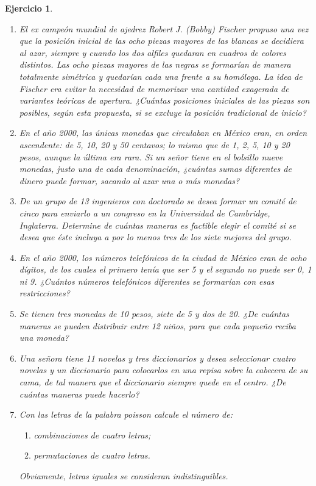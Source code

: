 \documentclass[12pt,twoside]{article}
\newtheorem{Ejer}{Ejercicio}
\begin{document}
\begin{Ejer}
\begin{enumerate}
\item El ex campeón mundial de ajedrez Robert J. (Bobby) Fischer propuso una vez que la posición inicial de las ocho piezas mayores de las blancas se decidiera al azar, siempre y cuando los dos alfiles quedaran en cuadros de colores distintos. Las ocho piezas mayores de las negras se formarían de manera totalmente simétrica y quedarían cada una frente a su homóloga. La idea de Fischer era evitar la necesidad de memorizar una cantidad exagerada de variantes teóricas de apertura. ¿Cuántas posiciones iniciales de las piezas son posibles, según esta propuesta, si se excluye la posición tradicional de inicio?

\item En el año 2000, las únicas monedas que circulaban en México eran, en orden ascendente: de 5, 10, 20 y 50 centavos; lo mismo que de 1, 2, 5, 10 y 20 pesos, aunque la última era rara. Si un señor tiene en el bolsillo nueve monedas, justo una de cada denominación, ¿cuántas sumas diferentes de dinero puede formar, sacando al azar una o más monedas?

\item De un grupo de 13 ingenieros con doctorado se desea formar un comité de cinco para enviarlo a un congreso en la Universidad de Cambridge, Inglaterra. Determine de cuántas maneras es factible elegir el comité si se desea que éste incluya a por lo menos tres de los siete mejores del grupo.

\item En el año 2000, los números telefónicos de la ciudad de México eran de ocho dígitos, de los cuales el primero tenía que ser 5 y el segundo no puede ser 0, 1 ni 9. ¿Cuántos números telefónicos diferentes se formarían con esas restricciones?

\item Se tienen tres monedas de 10 pesos, siete de 5 y dos de 20. ¿De cuántas maneras se pueden distribuir entre 12 niños, para que cada pequeño reciba una moneda?

\item Una señora tiene 11 novelas y tres diccionarios y desea seleccionar cuatro novelas y un diccionario para colocarlos en una repisa sobre la cabecera de su cama, de tal manera que el diccionario siempre quede en el centro. ¿De cuántas maneras puede hacerlo?

\item Con las letras de la palabra \textit{poisson} calcule el número de:
\begin{enumerate}
\item combinaciones de cuatro letras;
\item permutaciones de cuatro letras.
\end{enumerate}
Obviamente, letras iguales se consideran indistinguibles.


\end{enumerate}
\end{Ejer}
\end{document}
